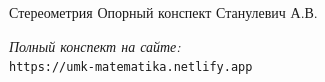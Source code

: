 \documentclass{umk-matematika}
\begin{document}
\maketitlepage
    {Стереометрия}
    {Опорный конспект}
    {Станулевич А.В.}

\begin{center}
\vspace{1.5cm}
\textit{Полный конспект на сайте:}\\
\texttt{https://umk-matematika.netlify.app}
\end{center}
\end{document}
